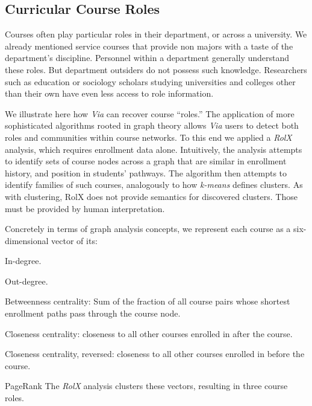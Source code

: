 \subsection{Curricular Course Roles}
\label{sec:rolx}
Courses often play particular roles in their department, or across a
university. We already mentioned service courses that provide non
majors with a taste of the department's discipline. Personnel within a
department generally understand these roles. But department outsiders
do not possess such knowledge. Researchers such as education or
sociology scholars studying universities and colleges other than their
own have even less access to role information.

We illustrate here how {\em Via} can recover course ``roles.'' The
application of more sophisticated algorithms rooted in graph theory
allows {\em Via} users to detect both roles and communities within
course networks. To this end we applied a {\em RolX}
\cite{Henderson2012} analysis, which requires enrollment data
alone. Intuitively, the analysis attempts to identify sets of course
nodes across a graph that are similar in enrollment history, and
position in students' pathways. The algorithm then attempts to
identify families of such courses, analogously to how {\em k-means}
defines clusters. As with clustering, RolX does not provide semantics
for discovered clusters. Those must be provided by human
interpretation.

Concretely in terms of graph analysis concepts, we represent each
course as a six-dimensional vector of its:
\squishlist  %
  \item In-degree.
  \item Out-degree.
  \item Betweenness centrality: Sum of the fraction of all course pairs
    whose shortest enrollment paths pass through the course node.
  \item Closeness centrality: closeness to all other courses enrolled
    in after the course.
  \item Closeness centrality, reversed: closeness to all other courses
    enrolled in before the course.
  \item PageRank
\squishend
The {\em RolX} analysis clusters these vectors, resulting in three
course roles. 

